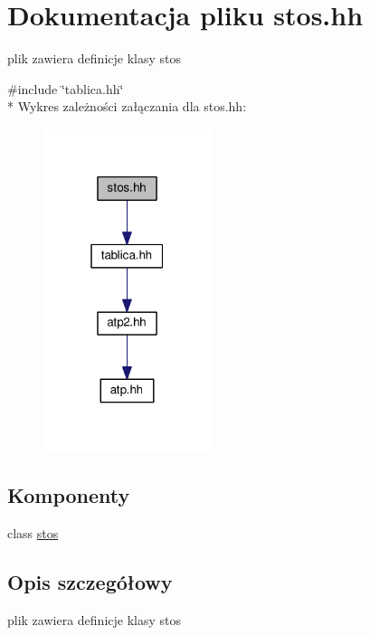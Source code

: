 \hypertarget{stos_8hh}{}\section{Dokumentacja pliku stos.\+hh}
\label{stos_8hh}


plik zawiera definicje klasy stos  


{\ttfamily \#include \char`\"{}tablica.\+hh\char`\"{}}\\*
Wykres zależności załączania dla stos.\+hh\+:\nopagebreak
\begin{figure}[H]
\begin{center}
\leavevmode
\includegraphics[width=139pt]{stos_8hh__incl}
\end{center}
\end{figure}
\subsection*{Komponenty}
\begin{DoxyCompactItemize}
\item 
class \hyperlink{classstos}{stos}
\end{DoxyCompactItemize}


\subsection{Opis szczegółowy}
plik zawiera definicje klasy stos 

